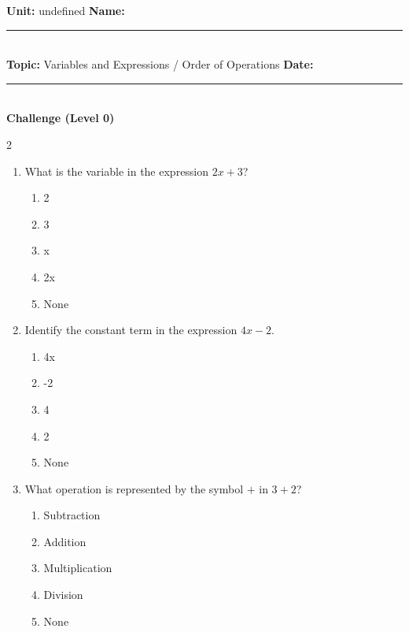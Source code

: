 \documentclass[10pt]{article}
\begin{document}
\enlargethispage{2.5cm}

\begin{tcolorbox}[colback=mainblue!5, colframe=mainblue, sharp corners, boxrule=0.5pt]
    \small \textbf{Unit:} undefined \hfill \textbf{Name:} \rule{3cm}{0.4pt} \\
    \small \textbf{Topic:} Variables and Expressions / Order of Operations \hfill \textbf{Date:} \rule{2cm}{0.4pt} \\
    \centering \textbf{\large Challenge (Level 0)}
\end{tcolorbox}

\vspace{0.2cm}

\begin{multicols}{2}
\begin{enumerate}[label=\textbf{Q\arabic*.}, leftmargin=*, itemsep=6pt, parsep=0pt]

  \item \small What is the variable in the expression $2x + 3$?
  \begin{enumerate}[label=(\Alph*), leftmargin=0.6cm, nosep, itemsep=2pt]
    \item 2
    \item 3
    \item x
    \item 2x
    \item None
  \end{enumerate}

  \item \small Identify the constant term in the expression $4x - 2$.
  \begin{enumerate}[label=(\Alph*), leftmargin=0.6cm, nosep, itemsep=2pt]
    \item 4x
    \item -2
    \item 4
    \item 2
    \item None
  \end{enumerate}

  \item \small What operation is represented by the symbol $+$ in $3 + 2$?
  \begin{enumerate}[label=(\Alph*), leftmargin=0.6cm, nosep, itemsep=2pt]
    \item Subtraction
    \item Addition
    \item Multiplication
    \item Division
    \item None
  \end{enumerate}


\end{enumerate}
\end{multicols}
\end{document}
